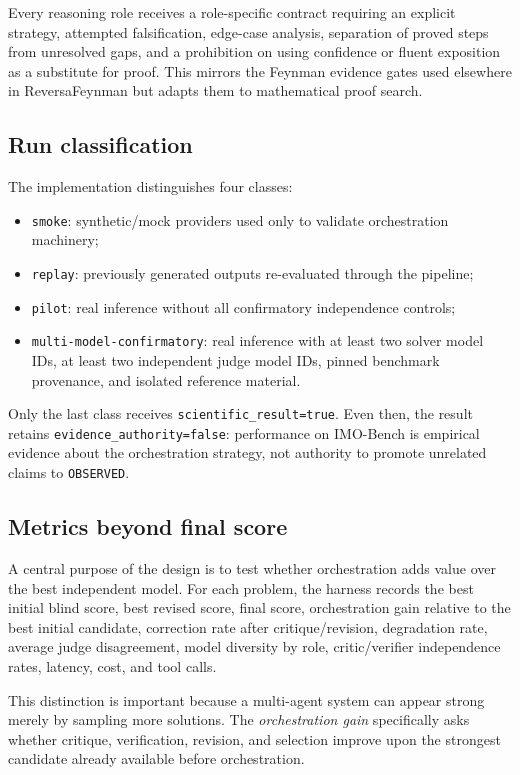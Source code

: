 Every reasoning role receives a role-specific contract requiring an explicit strategy, attempted falsification, edge-case analysis, separation of proved steps from unresolved gaps, and a prohibition on using confidence or fluent exposition as a substitute for proof. This mirrors the Feynman evidence gates used elsewhere in ReversaFeynman but adapts them to mathematical proof search.

\subsection{Run classification}

The implementation distinguishes four classes:

\begin{itemize}
  \item \texttt{smoke}: synthetic/mock providers used only to validate orchestration machinery;
  \item \texttt{replay}: previously generated outputs re-evaluated through the pipeline;
  \item \texttt{pilot}: real inference without all confirmatory independence controls;
  \item \texttt{multi-model-confirmatory}: real inference with at least two solver model IDs, at least two independent judge model IDs, pinned benchmark provenance, and isolated reference material.
\end{itemize}

Only the last class receives \texttt{scientific\_result=true}. Even then, the result retains \texttt{evidence\_authority=false}: performance on IMO-Bench is empirical evidence about the orchestration strategy, not authority to promote unrelated claims to \texttt{OBSERVED}.

\subsection{Metrics beyond final score}

A central purpose of the design is to test whether orchestration adds value over the best independent model. For each problem, the harness records the best initial blind score, best revised score, final score, orchestration gain relative to the best initial candidate, correction rate after critique/revision, degradation rate, average judge disagreement, model diversity by role, critic/verifier independence rates, latency, cost, and tool calls.

This distinction is important because a multi-agent system can appear strong merely by sampling more solutions. The \emph{orchestration gain} specifically asks whether critique, verification, revision, and selection improve upon the strongest candidate already available before orchestration.

